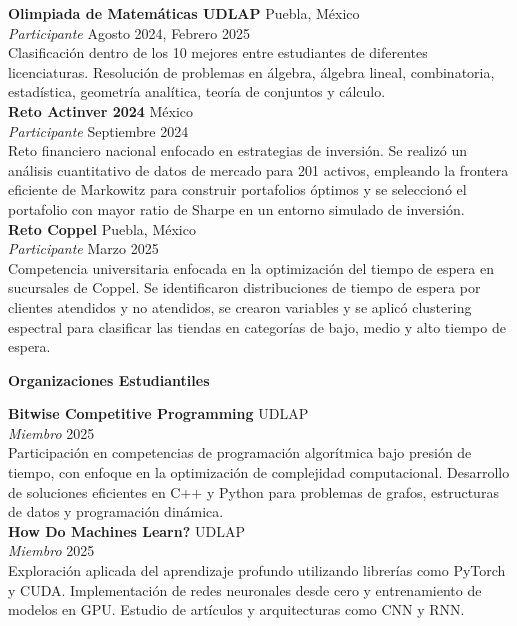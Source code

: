 \documentclass[8pt]{extarticle} %
\begin{document}
\textbf{Olimpiada de Matemáticas UDLAP} \hfill Puebla, México\\  
\textit{Participante} \hfill Agosto 2024,  Febrero 2025\\  
Clasificación dentro de los 10 mejores entre estudiantes de diferentes licenciaturas. Resolución de problemas en álgebra, álgebra lineal, combinatoria, estadística, geometría analítica, teoría de conjuntos y cálculo.\\

\textbf{Reto Actinver 2024} \hfill México\\  
\textit{Participante} \hfill Septiembre 2024\\  
Reto financiero nacional enfocado en estrategias de inversión. Se realizó un análisis cuantitativo de datos de mercado para 201 activos, empleando la frontera eficiente de Markowitz para construir portafolios óptimos y se seleccionó el portafolio con mayor ratio de Sharpe en un entorno simulado de inversión.\\

\textbf{Reto Coppel} \hfill Puebla, México\\  
\textit{Participante} \hfill Marzo 2025\\  
Competencia universitaria enfocada en la optimización del tiempo de espera en sucursales de Coppel. Se identificaron distribuciones de tiempo de espera por clientes atendidos y no atendidos, se crearon variables y se aplicó clustering espectral para clasificar las tiendas en categorías de bajo, medio y alto tiempo de espera. \\

\begin{center}
\vspace{1ex}
\textbf{Organizaciones Estudiantiles}
\vspace{-1ex}
\end{center}

\textbf{Bitwise Competitive Programming} \hfill UDLAP \\
\textit{Miembro} \hfill 2025 \\
Participación en competencias de programación algorítmica bajo presión de tiempo, con enfoque en la optimización de complejidad computacional. Desarrollo de soluciones eficientes en C++ y Python para problemas de grafos, estructuras de datos y programación dinámica. \\

\textbf{How Do Machines Learn?} \hfill UDLAP \\
\textit{Miembro} \hfill 2025 \\
Exploración aplicada del aprendizaje profundo utilizando librerías como PyTorch y CUDA. Implementación de redes neuronales desde cero y entrenamiento de modelos en GPU. Estudio de artículos y arquitecturas como CNN y RNN. \\
\end{document}
